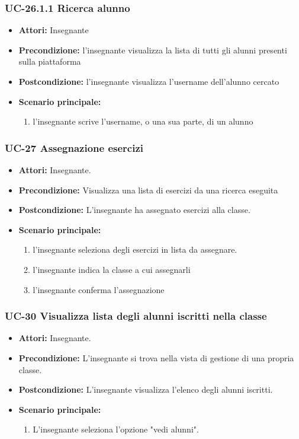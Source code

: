 \subsubsection{UC-26.1.1 Ricerca alunno}
\begin{itemize}
	\item \textbf{Attori:} Insegnante
	\item \textbf{Precondizione:} l'insegnante visualizza la lista di tutti gli alunni presenti sulla piattaforma
	\item \textbf{Postcondizione:} l'insegnante visualizza l'username dell'alunno cercato
	\item \textbf{Scenario principale:}
	\begin{enumerate}
		\item l'insegnante scrive l'username, o una sua parte, di un alunno
	\end{enumerate}
\end{itemize}

\subsubsection{UC-27 Assegnazione esercizi}
\begin{itemize}
	\item \textbf{Attori:} Insegnante.
	\item \textbf{Precondizione:} Visualizza una lista di esercizi da una ricerca eseguita
	\item \textbf{Postcondizione:} L'insegnante ha assegnato esercizi alla classe.
	\item \textbf{Scenario principale:}
	\begin{enumerate}
		\item l'insegnante seleziona degli esercizi in lista da assegnare.
		\item l'insegnante indica la classe a cui assegnarli
		\item l'insegnante conferma l'assegnazione
	\end{enumerate}
\end{itemize}

\subsubsection{UC-30 Visualizza lista degli alunni iscritti nella classe}		
\begin{itemize}
	\item \textbf{Attori:} Insegnante.
	\item \textbf{Precondizione:} L'insegnante si trova nella vista di gestione di una propria classe.
	\item \textbf{Postcondizione:} L'insegnante visualizza l'elenco degli alunni iscritti.
	\item \textbf{Scenario principale:}
	\begin{enumerate}
		\item L'insegnante seleziona l'opzione "vedi alunni".
	\end{enumerate}		
\end{itemize}

